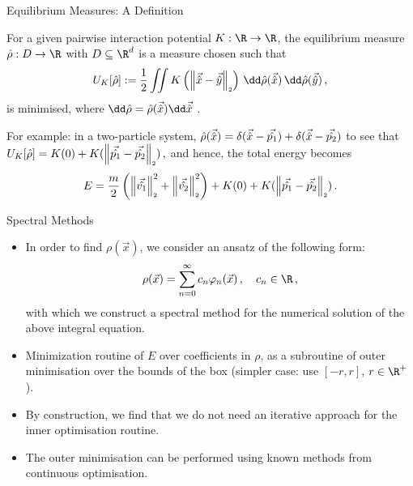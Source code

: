 \documentclass[aspectratio=169, hyperref={colorlinks=true}]{beamer}
\begin{document}
  \begin{frame}{Equilibrium Measures: A Definition}
    \begin{definition}
      For a given pairwise interaction potential $K: \R \to \R$, the equilibrium measure $\hat{\rho}: D \to \R$ with $D \subseteq \R^d$ is a measure chosen such that
      $$U_K[\hat{\rho}] := \frac{1}{2} \iint K\left(\norm{\hatvec{x} - \hatvec{y}}\right) \,\dd\hat{\rho}(\hatvec{x})\,\dd\hat{\rho}(\hatvec{y})\,,$$
      is minimised, where $\dd\hat{\rho} = \hat{\rho}(\hatvec{x})\dd\hatvec{x}$ \parencite{2021-arbitrary-dimensions}.
    \end{definition}
    \pause

    For example: in a two-particle system, $\hat{\rho}(\vec{\hat{x}}) = \delta(\vec{\hat{x}}-\vec{\hat{p_1}}) + \delta(\vec{\hat{x}}-\vec{\hat{p_2}})$ to see that
    $U_K[\hat{\rho}] = K(0) + K(\left\lVert\vec{\hat{p_1}} - \vec{\hat{p_2}}\right\rVert_{\scriptscriptstyle 2})\,,$
    and hence, the total energy becomes
    $$E = \frac{m}{2} \left(\left\lVert\vec{\hat{v_1}}\right\rVert_{\scriptscriptstyle 2}^2 + \left\lVert\vec{\hat{v_2}}\right\rVert_{\scriptscriptstyle 2}^2\right) + K(0) + K(\left\lVert\vec{\hat{p_1}} - \vec{\hat{p_2}}\right\rVert_{\scriptscriptstyle 2})\,.$$
  \end{frame}

  \begin{frame}{Spectral Methods}
    \begin{itemize}
      \item In order to find $\rho(\vec{x})$, we consider an ansatz of the following form:
            $$\rho(\vec{x}) = \sum_{n=0}^{\infty} c_n \varphi_n(\vec{x})\,,\quad c_n \in \R\,,$$
            with which we construct a spectral method for the numerical solution of the above integral equation.
      \item Minimization routine of $E$ over coefficients in $\rho$, as a subroutine of outer minimisation over the bounds of the box (simpler case: use $[-r, r]$, $r \in \R^+$).
      \item By construction, we find that we do not need an iterative approach for the inner optimisation routine.
      \item The outer minimisation can be performed using known methods from continuous optimisation.
    \end{itemize}
  \end{frame}
\end{document}
